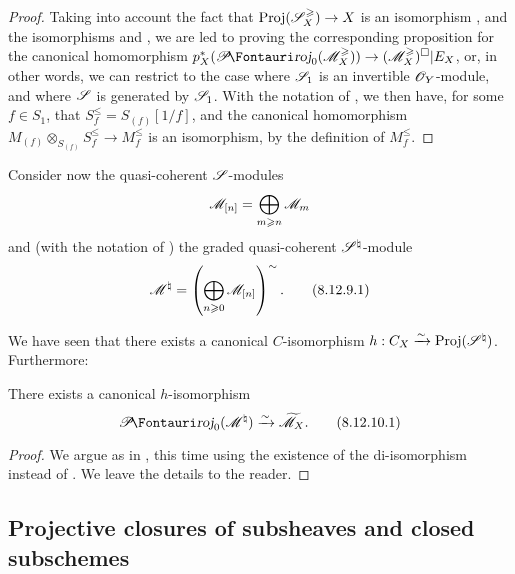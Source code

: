 \begin{proof}
\label{proof-II.8.12.8}
Taking into account the fact that $\Proj(\sh{S}_X^\geq)\to X$ is an isomorphism , and the
isomorphisms  and , we are led to proving the corresponding proposition for the canonical homomorphism $p_X^*(\shProj_0(\sh{M}_X^\geq))\to(\sh{M}_X^\geq)^\square|E_X$, or, in other words, we can restrict to the case where $\mathscr{S}_1$ is an invertible $\mathscr{O}_Y$-module, and where $\mathscr{S}$ is generated by $\mathscr{S}_1$.
With the notation of , we then have, for some $f\in S_1$, that $S_f^\leq=S_{(f)}[1/f]$, and the canonical homomorphism $M_{(f)}\otimes_{S_{(f)}}S_f^\leq\to M_f^\leq$ is an isomorphism, by the definition of $M_f^\leq$.
\end{proof}

\begin{env}[8.12.9]
\label{II.8.12.9}
Consider now the quasi-coherent $\mathscr{S}$-modules
\[
    \mathscr{M}_{[n]}=\bigoplus_{m\geqslant n}\mathscr{M}_m
\]
and (with the notation of ) the graded quasi-coherent $\mathscr{S}^\natural$-module
\[
\label{II.8.12.9.1}
    \mathscr{M}^\natural=\left(\bigoplus_{n\geqslant0}\mathscr{M}_{[n]}\right)^\sim.
\tag{8.12.9.1}
\]

We have seen  that there exists a canonical $C$-isomorphism $h:C_X\xrightarrow{\sim}\operatorname{Proj}(\mathscr{S}^\natural)$.
Furthermore:
\end{env}

\begin{proposition}[8.12.10]
\label{II.8.12.10}
There exists a canonical $h$-isomorphism
\[
\label{II.8.12.10.1}
    \shProj_0(\sh{M}^\natural) \xrightarrow{\sim} \widetilde{\sh{M}}_X.
\tag{8.12.10.1}
\]
\end{proposition}

\begin{proof}
\label{proof-II.8.12.10}
We argue as in , this time using the existence of the di-isomorphism  instead of .
We leave the details to the reader.
\end{proof}


\subsection{Projective closures of subsheaves and closed subschemes}
\label{subsection:II.8.13}

